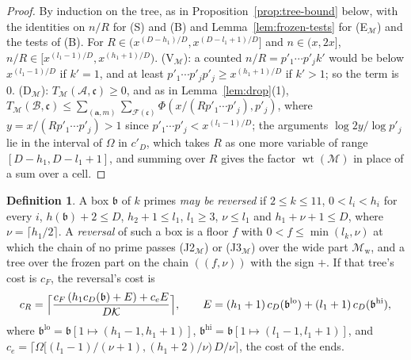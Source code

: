 \documentclass[11pt]{article}
\theoremstyle{definition}
\newtheorem{definition}[theorem]{Definition}
\begin{document}
\begin{proof}
By induction on the tree, as in Proposition~\ref{prop:tree-bound} below, with the identities on $n/R$ for (S) and (B)
and
Lemma~\ref{lem:frozen-tests} for (E$_{\mathcal M}$) and the tests of (B). For $R \in (x^{(D - h_1)/D}, x^{(D - l_1 +
1)/D}]$ and $n \in (x, 2x]$, $n/R \in [x^{(l_1 - 1)/D}, x^{(h_1 + 1)/D})$. (V$_{\mathcal M}$): a counted $n/R = p'_1
\cdots
p'_j k'$ would be below $x^{(l_1 - 1)/D}$ if $k' = 1$, and at least $p'_1 \cdots p'_j p'_j \ge x^{(h_1 + 1)/D}$ if $k' >
1$;
so the term is $0$. (D$_{\mathcal M}$): $T_{\mathcal M}(\mathcal A, \mathfrak c) \ge 0$, and as in
Lemma~\ref{lem:drop}(1), $T_{\mathcal M}(\mathcal B, \mathfrak c) \le \sum_{(\mathbf a, m)} \sum_{\mathcal F(\mathfrak
c)}
\Phi(x/(Rp'_1 \cdots p'_j), p'_j)$, where $y = x/(R p'_1 \cdots p'_j) > 1$ since $p'_1 \cdots p'_j < x^{(l_1 - 1)/D}$;
the
arguments $\log 2y/\log p'_j$ lie in the interval of $\Omega$ in $c'_D$, which takes $R$ as one more variable of range
$[D - h_1, D - l_1 + 1]$, and summing over $R$ gives the factor $\operatorname{wt}(\mathcal M)$ in place of a sum over a
cell.
\end{proof}

\begin{definition}\label{def:reversal}
A box $\mathfrak b$ of $k$ primes \emph{may be reversed} if $2 \le k \le 11$, $0 < l_i < h_i$ for every $i$,
$h(\mathfrak
b) + 2 \le D$, $h_2 + 1 \le l_1$, $l_1 \ge 3$, $\nu \le l_1$ and $h_1 + \nu + 1 \le D$, where $\nu = \lceil h_1/2
\rceil$.
A \emph{reversal} of such a box is a floor $f$ with $0 < f \le \min(l_k, \nu)$ at which the chain of no prime passes
(J2$_{\mathcal M}$) or (J3$_{\mathcal M}$) over the wide part $\mathcal M_{\mathrm w}$, and a tree over the frozen part
on
the chain $((f, \nu))$ with the sign $+$. If that tree's cost is $c_F$, the reversal's cost is
\begin{equation}\label{eq:cR}
  c_R = \Bigl\lceil \frac{c_F\,(h_1 c_D(\mathfrak b) + E) + c_e E}{D\mathcal K} \Bigr\rceil, \qquad
  E = (h_1 + 1)\, c_D(\mathfrak b^{\mathrm{lo}}) + (l_1 + 1)\, c_D(\mathfrak b^{\mathrm{hi}}),
\end{equation}
where $\mathfrak b^{\mathrm{lo}} = \mathfrak b[1 \mapsto (h_1 - 1, h_1 + 1)]$, $\mathfrak b^{\mathrm{hi}} = \mathfrak
b[1 \mapsto (l_1 - 1, l_1 + 1)]$, and $c_e = \lceil \Omega[(l_1 - 1)/(\nu + 1), (h_1 + 2)/\nu)\, D/\nu \rceil$, the
cost of the ends.
\end{definition}
\end{document}
